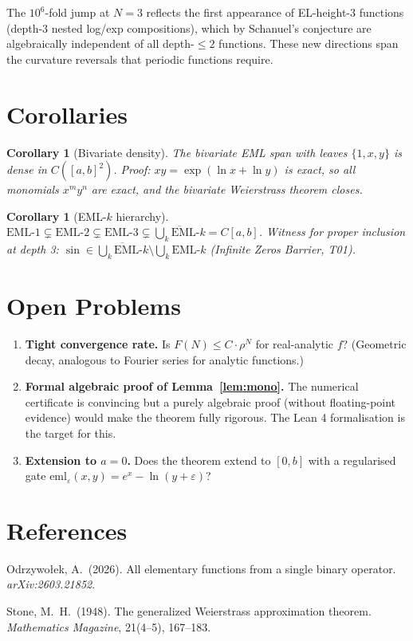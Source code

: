 \documentclass[11pt]{article}
\newtheorem{corollary}[theorem]{Corollary}
\theoremstyle{remark}
\begin{document}
The $10^6$-fold jump at $N=3$ reflects the first appearance of
EL-height-3 functions (depth-3 nested log/exp compositions), which
by Schanuel's conjecture are algebraically independent of all
depth-$\leq 2$ functions.  These new directions span the curvature
reversals that periodic functions require.

\section{Corollaries}

\begin{corollary}[Bivariate density]
The bivariate EML span with leaves $\{1,x,y\}$ is dense in
$C([a,b]^2)$.  Proof: $xy = \exp(\ln x + \ln y)$ is exact, so all
monomials $x^m y^n$ are exact, and the bivariate Weierstrass theorem closes.
\end{corollary}

\begin{corollary}[EML-$k$ hierarchy]
$\mathrm{EML}\text{-}1 \subsetneq \mathrm{EML}\text{-}2 \subsetneq
\mathrm{EML}\text{-}3 \subsetneq \overline{\bigcup_k \mathrm{EML}\text{-}k} = C[a,b]$.
Witness for proper inclusion at depth 3:
$\sin \in \overline{\bigcup_k \mathrm{EML}\text{-}k} \setminus \bigcup_k \mathrm{EML}\text{-}k$
(Infinite Zeros Barrier, T01).
\end{corollary}

\section{Open Problems}

\begin{enumerate}
\item \textbf{Tight convergence rate.} Is $F(N) \leq C \cdot \rho^N$ for real-analytic $f$?
  (Geometric decay, analogous to Fourier series for analytic functions.)
\item \textbf{Formal algebraic proof of Lemma~\ref{lem:mono}.}
  The numerical certificate is convincing but a purely algebraic
  proof (without floating-point evidence) would make the theorem
  fully rigorous.  The Lean 4 formalisation is the target for this.
\item \textbf{Extension to $a=0$.}
  Does the theorem extend to $[0,b]$ with a regularised gate
  $\mathrm{eml}_\varepsilon(x,y) = e^x - \ln(y+\varepsilon)$?
\end{enumerate}

\section*{References}
Odrzywołek, A.\ (2026). All elementary functions from a single binary operator.
\textit{arXiv:2603.21852}.

Stone, M.\ H.\ (1948). The generalized Weierstrass approximation theorem.
\textit{Mathematics Magazine}, 21(4--5), 167--183.
\end{document}
